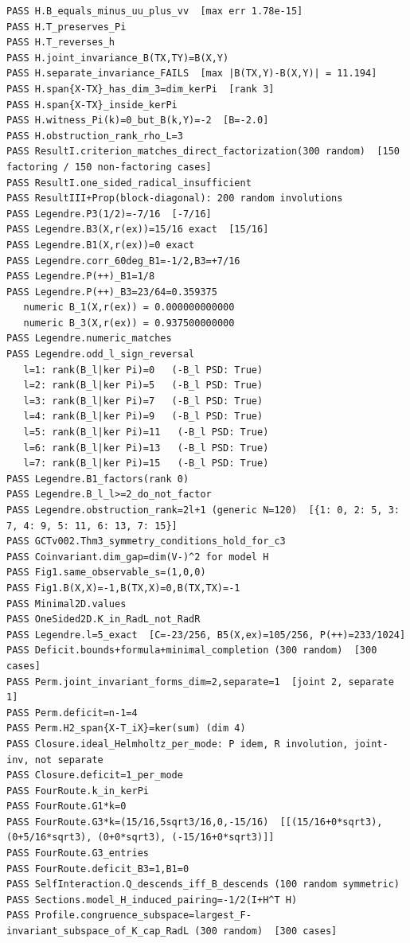 \documentclass[11pt,a4paper]{article}
\theoremstyle{plain}
\theoremstyle{definition}
\begin{document}
\begin{lstlisting}[numbers=none,xleftmargin=0pt,basicstyle=\ttfamily\tiny,breaklines=true]
PASS H.B_equals_minus_uu_plus_vv  [max err 1.78e-15]
PASS H.T_preserves_Pi
PASS H.T_reverses_h
PASS H.joint_invariance_B(TX,TY)=B(X,Y)
PASS H.separate_invariance_FAILS  [max |B(TX,Y)-B(X,Y)| = 11.194]
PASS H.span{X-TX}_has_dim_3=dim_kerPi  [rank 3]
PASS H.span{X-TX}_inside_kerPi
PASS H.witness_Pi(k)=0_but_B(k,Y)=-2  [B=-2.0]
PASS H.obstruction_rank_rho_L=3
PASS ResultI.criterion_matches_direct_factorization(300 random)  [150 factoring / 150 non-factoring cases]
PASS ResultI.one_sided_radical_insufficient
PASS ResultIII+Prop(block-diagonal): 200 random involutions
PASS Legendre.P3(1/2)=-7/16  [-7/16]
PASS Legendre.B3(X,r(ex))=15/16 exact  [15/16]
PASS Legendre.B1(X,r(ex))=0 exact
PASS Legendre.corr_60deg_B1=-1/2,B3=+7/16
PASS Legendre.P(++)_B1=1/8
PASS Legendre.P(++)_B3=23/64=0.359375
   numeric B_1(X,r(ex)) = 0.000000000000
   numeric B_3(X,r(ex)) = 0.937500000000
PASS Legendre.numeric_matches
PASS Legendre.odd_l_sign_reversal
   l=1: rank(B_l|ker Pi)=0   (-B_l PSD: True)
   l=2: rank(B_l|ker Pi)=5   (-B_l PSD: True)
   l=3: rank(B_l|ker Pi)=7   (-B_l PSD: True)
   l=4: rank(B_l|ker Pi)=9   (-B_l PSD: True)
   l=5: rank(B_l|ker Pi)=11   (-B_l PSD: True)
   l=6: rank(B_l|ker Pi)=13   (-B_l PSD: True)
   l=7: rank(B_l|ker Pi)=15   (-B_l PSD: True)
PASS Legendre.B1_factors(rank 0)
PASS Legendre.B_l_l>=2_do_not_factor
PASS Legendre.obstruction_rank=2l+1 (generic N=120)  [{1: 0, 2: 5, 3: 7, 4: 9, 5: 11, 6: 13, 7: 15}]
PASS GCTv002.Thm3_symmetry_conditions_hold_for_c3
PASS Coinvariant.dim_gap=dim(V-)^2 for model H
PASS Fig1.same_observable_s=(1,0,0)
PASS Fig1.B(X,X)=-1,B(TX,X)=0,B(TX,TX)=-1
PASS Minimal2D.values
PASS OneSided2D.K_in_RadL_not_RadR
PASS Legendre.l=5_exact  [C=-23/256, B5(X,ex)=105/256, P(++)=233/1024]
PASS Deficit.bounds+formula+minimal_completion (300 random)  [300 cases]
PASS Perm.joint_invariant_forms_dim=2,separate=1  [joint 2, separate 1]
PASS Perm.deficit=n-1=4
PASS Perm.H2_span{X-T_iX}=ker(sum) (dim 4)
PASS Closure.ideal_Helmholtz_per_mode: P idem, R involution, joint-inv, not separate
PASS Closure.deficit=1_per_mode
PASS FourRoute.k_in_kerPi
PASS FourRoute.G1*k=0
PASS FourRoute.G3*k=(15/16,5sqrt3/16,0,-15/16)  [[(15/16+0*sqrt3), (0+5/16*sqrt3), (0+0*sqrt3), (-15/16+0*sqrt3)]]
PASS FourRoute.G3_entries
PASS FourRoute.deficit_B3=1,B1=0
PASS SelfInteraction.Q_descends_iff_B_descends (100 random symmetric)
PASS Sections.model_H_induced_pairing=-1/2(I+H^T H)
PASS Profile.congruence_subspace=largest_F-invariant_subspace_of_K_cap_RadL (300 random)  [300 cases]

\end{lstlisting}
\end{document}
